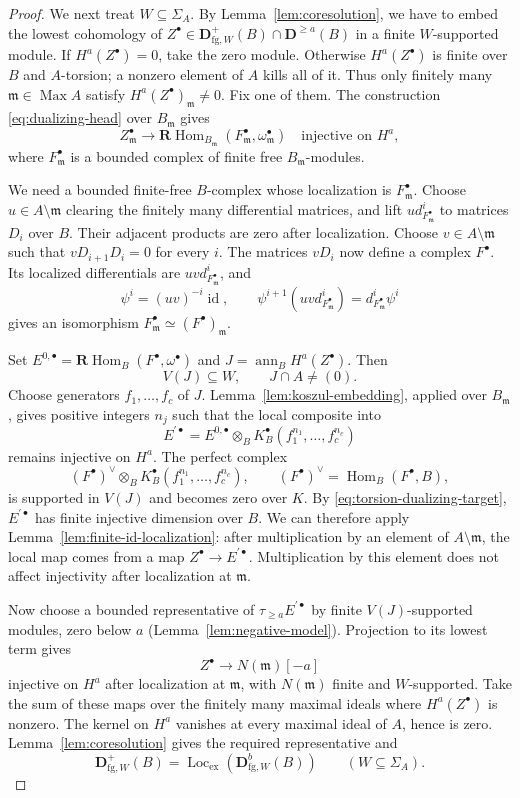 \documentclass[11pt]{amsart}
\numberwithin{equation}{section}
\theoremstyle{definition}
\theoremstyle{remark}
\DeclareMathOperator{\Max}{Max}
\DeclareMathOperator{\Loc}{Loc}
\DeclareMathOperator{\Hom}{Hom}
\newcommand{\RHom}{\mathbf R\!\Hom}
\newcommand{\D}{\mathbf D}
\newcommand{\fg}{\mathrm{fg}}
\newcommand{\Lex}{\Loc_{\mathrm{ex}}}
\newcommand{\m}{\mathfrak m}
\begin{document}
\begin{proof}
We next treat $W\subseteq\Sigma_A$. By Lemma~\ref{lem:coresolution},
we have to embed the lowest cohomology of
$Z^{\bullet}\in\D^+_{\fg,W}(B)\cap\D^{\geq a}(B)$ in a finite
$W$-supported module. If $H^a(Z^{\bullet})=0$, take the zero module.
Otherwise $H^a(Z^{\bullet})$ is finite over $B$ and $A$-torsion;
a nonzero element of $A$ kills all of it. Thus only finitely many
$\m\in\Max A$ satisfy $H^a(Z^{\bullet})_\m\ne0$.
Fix one of them. The construction
\eqref{eq:dualizing-head} over $B_\m$ gives
\[
 Z_\m^{\bullet}\longrightarrow
 \RHom_{B_\m}(F_\m^{\bullet},\omega_\m^{\bullet})
 \quad\text{injective on }H^a,
\]
where $F_\m^{\bullet}$ is a bounded complex of finite free $B_\m$-modules.

We need a bounded finite-free $B$-complex whose localization is
$F_\m^{\bullet}$. Choose $u\in A\setminus\m$ clearing the
finitely many differential matrices, and lift
$u d^i_{F_\m^{\bullet}}$ to matrices $D_i$ over $B$. Their adjacent
products are zero after localization. Choose $v\in A\setminus\m$
such that $vD_{i+1}D_i=0$ for every $i$. The matrices $vD_i$
now define a complex $F^{\bullet}$. Its localized differentials
are $uvd^i_{F_\m^\bullet}$, and
\[
 \psi^i=(uv)^{-i}\operatorname{id},\qquad
 \psi^{i+1}(uvd^i_{F_\m^\bullet})
       =d^i_{F_\m^\bullet}\psi^i
\]
gives an isomorphism $F_\m^\bullet\simeq(F^\bullet)_\m$.

Set $E^{0,\bullet}=\RHom_B(F^{\bullet},\omega^{\bullet})$ and
$J=\operatorname{ann}_B H^a(Z^{\bullet})$. Then
\[
 V(J)\subseteq W,\qquad J\cap A\ne(0).
\]
Choose generators $f_1,\ldots,f_c$ of $J$.
Lemma~\ref{lem:koszul-embedding}, applied over $B_\m$, gives
positive integers $n_j$ such that the local composite into
\[
 E^{\prime\bullet}=E^{0,\bullet}\otimes_BK_B^{\bullet}(f_1^{n_1},\ldots,f_c^{n_c})
\]
remains injective on $H^a$.
The perfect complex
\[
 (F^{\bullet})^\vee\otimes_BK_B^{\bullet}(f_1^{n_1},\ldots,f_c^{n_c}),
 \qquad (F^{\bullet})^\vee=\Hom_B(F^{\bullet},B),
\]
is supported in $V(J)$ and becomes zero over $K$.
By \eqref{eq:torsion-dualizing-target}, $E^{\prime\bullet}$ has
finite injective dimension over $B$. We can therefore apply
Lemma~\ref{lem:finite-id-localization}: after multiplication by
an element of $A\setminus\m$, the local map comes from a map
$Z^{\bullet}\to E^{\prime\bullet}$. Multiplication by this
element does not affect injectivity after localization at $\m$.

Now choose a bounded representative of $\tau_{\geq a}E^{\prime\bullet}$ by finite
$V(J)$-supported modules, zero below $a$ (Lemma~\ref{lem:negative-model}).
Projection to its lowest term gives
\[
 Z^{\bullet}\longrightarrow N(\m)[-a]
\]
injective on $H^a$ after localization at $\m$, with $N(\m)$ finite
and $W$-supported. Take the sum of these maps over the finitely many maximal ideals
where $H^a(Z^{\bullet})$ is nonzero. The kernel on $H^a$
vanishes at every maximal ideal of $A$, hence is zero.
Lemma~\ref{lem:coresolution} gives the required representative and
\begin{equation}\label{eq:A-torsion-models}
 \D^+_{\fg,W}(B)=\Lex(\D^b_{\fg,W}(B))
 \qquad(W\subseteq\Sigma_A).
\end{equation}


\end{proof}
\end{document}
